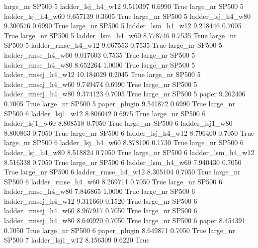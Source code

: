   large_nr    SP500                 5   ladder_lsj_h4_w12   9.510397      0.6990    True
  large_nr    SP500                 5   ladder_lsj_h4_w60   9.657139      0.3605    True
  large_nr    SP500                 5   ladder_lsj_h4_w80   9.300576      0.6990    True
  large_nr    SP500                 5   ladder_lsm_h4_w12   9.218446      0.7005    True
  large_nr    SP500                 5   ladder_lsm_h4_w60   8.778746      0.7535    True
  large_nr    SP500                 5  ladder_rmse_h4_w12   9.067553      0.7535    True
  large_nr    SP500                 5  ladder_rmse_h4_w60   9.017603      0.7535    True
  large_nr    SP500                 5  ladder_rmse_h4_w80   8.652264      1.0000    True
  large_nr    SP500                 5 ladder_rmsej_h4_w12  10.184029      0.2045    True
  large_nr    SP500                 5 ladder_rmsej_h4_w60   9.749474      0.6990    True
  large_nr    SP500                 5 ladder_rmsej_h4_w80   9.374123      0.7005    True
  large_nr    SP500                 5               paper   9.262406      0.7005    True
  large_nr    SP500                 5        paper_plugin   9.541872      0.6990    True
  large_nr    SP500                 6     ladder_lsj1_w12   8.806042      0.6975    True
  large_nr    SP500                 6     ladder_lsj1_w60   8.808518      0.7050    True
  large_nr    SP500                 6     ladder_lsj1_w80   8.800863      0.7050    True
  large_nr    SP500                 6   ladder_lsj_h4_w12   8.796400      0.7050    True
  large_nr    SP500                 6   ladder_lsj_h4_w60   8.878100      0.1730    True
  large_nr    SP500                 6   ladder_lsj_h4_w80   8.518824      0.7050    True
  large_nr    SP500                 6   ladder_lsm_h4_w12   8.516338      0.7050    True
  large_nr    SP500                 6   ladder_lsm_h4_w60   7.940430      0.7050    True
  large_nr    SP500                 6  ladder_rmse_h4_w12   8.305104      0.7050    True
  large_nr    SP500                 6  ladder_rmse_h4_w60   8.269711      0.7050    True
  large_nr    SP500                 6  ladder_rmse_h4_w80   7.846865      1.0000    True
  large_nr    SP500                 6 ladder_rmsej_h4_w12   9.311660      0.1520    True
  large_nr    SP500                 6 ladder_rmsej_h4_w60   8.967917      0.7050    True
  large_nr    SP500                 6 ladder_rmsej_h4_w80   8.640920      0.7050    True
  large_nr    SP500                 6               paper   8.454391      0.7050    True
  large_nr    SP500                 6        paper_plugin   8.649871      0.7050    True
  large_nr    SP500                 7     ladder_lsj1_w12   8.156309      0.6220    True
